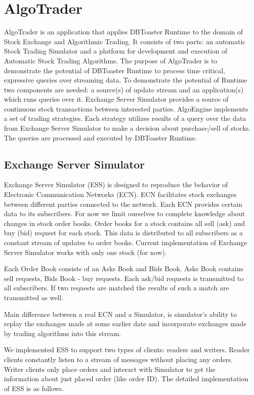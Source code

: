 \documentclass[14pt]{article}
\begin{document}
\section{AlgoTrader}

AlgoTrader is an application that applies DBToaster Runtime to the domain of Stock Exchange and Algorithmic Trading. It consists of two parts: an automatic Stock Trading Simulator and a platform for development and execution of Automatic Stock Trading Algorithms. The purpose of AlgoTrader is to demonstrate the potential of DBToaster Runtime to process time critical, expressive queries over streaming data. To demonstrate the potential of Runtime two components are needed: a source(s) of update stream and an application(s) which runs queries over it. Exchange Server Simulator provides a source of continuous stock transactions between interested parties. AlgoEngine implements a set of trading strategies. Each strategy utilizes results of a query over the data from Exchange Server Simulator to make a decision about purchase/sell of stocks. The queries are processed and executed by DBToaster Runtime.
  

\subsection{Exchange Server Simulator}
Exchange Server Simulator (ESS) is designed to reproduce the behavior of Electronic Communication Networks (ECN). ECN facilitates stock exchanges between different parties connected to the network. Each ECN provides certain data to its subscribers. For now we limit ourselves to complete knowledge about changes in stock order books. Order books for a stock contains all sell (ask) and buy (bid) request for each stock. This data is distributed to all subscribers as a constant stream of updates to order books. Current implementation of Exchange Server Simulator works with only one stock (for now). 

Each Order Book consists of an Asks Book and Bids Book. Asks Book contains sell requests, Bids Book - buy requests. Each ask/bid requests is transmitted to all subscribers. If two requests are matched the results of such a match are transmitted as well. 

Main difference between a real ECN and a Simulator, is simulator's ability to replay the exchanges made at some earlier date and incorporate exchanges made by trading algorithms into this stream. 

We implemented ESS to support two types of clients: readers and writers. Reader clients constantly listen to a stream of messages without placing any orders. Writer clients only place orders and interact with Simulator to get the information about just placed order (like order ID). The detailed implementation of ESS is as follows.
\end{document}
